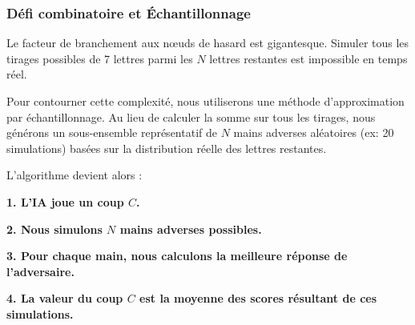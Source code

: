 \documentclass[a4paper]{article}
\begin{document}
\subsubsection{Défi combinatoire et Échantillonnage}
\hangindent=0.8mm
Le facteur de branchement aux nœuds de hasard est gigantesque. Simuler tous les tirages possibles de 7 lettres parmi les $N$ lettres restantes est impossible en temps réel.

\vspace{1\baselineskip}
\hangindent=0.8mm
Pour contourner cette complexité, nous utiliserons une méthode d'approximation par échantillonnage. Au lieu de calculer la somme sur tous les tirages, nous générons un sous-ensemble représentatif de $N$ mains adverses aléatoires (ex: 20 simulations) basées sur la distribution réelle des lettres restantes.

\vspace{1\baselineskip}
\hangindent=0.8mm
L'algorithme devient alors :

\hangindent=1.5cm
\textbf{1. L'IA joue un coup $C$.}

\vspace{1\baselineskip}
\hangindent=1.5cm
\textbf{2. Nous simulons $N$ mains adverses possibles.}

\vspace{1\baselineskip}
\hangindent=1.5cm
\textbf{3. Pour chaque main, nous calculons la meilleure réponse de l'adversaire.}

\vspace{1\baselineskip}
\hangindent=1.5cm
\textbf{4. La valeur du coup $C$ est la moyenne des scores résultant de ces simulations.}
\end{document}
